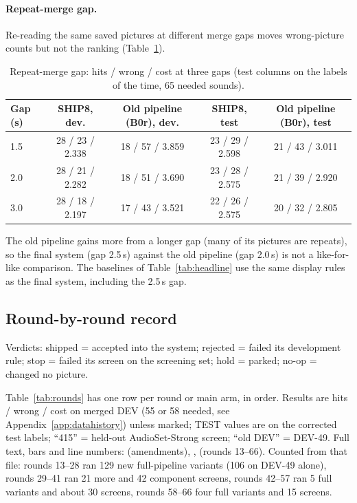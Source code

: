 \paragraph{Repeat-merge gap.} Re-reading the same saved pictures at different merge gaps moves wrong-picture counts but
not the ranking (Table~\ref{tab:mergegap}).
\begin{table}[htbp]\centering\small
\caption{Repeat-merge gap: hits / wrong / cost at three gaps (test columns on the labels of the time, 65 needed sounds).}\label{tab:mergegap}
\begin{tabular}{lcccc}
\toprule
Gap (s) & SHIP8, dev. & Old pipeline (B0r), dev. & SHIP8, test & Old pipeline (B0r), test \\
\midrule
1.5 & 28 / 23 / 2.338 & 18 / 57 / 3.859 & 23 / 29 / 2.598 & 21 / 43 / 3.011 \\
2.0 & 28 / 21 / 2.282 & 18 / 51 / 3.690 & 23 / 28 / 2.575 & 21 / 39 / 2.920 \\
3.0 & 28 / 18 / 2.197 & 17 / 43 / 3.521 & 22 / 26 / 2.575 & 20 / 32 / 2.805 \\
\bottomrule
\end{tabular}
\end{table}
The old pipeline gains more from a longer gap (many of its pictures are repeats), so the final system (gap 2.5\,s) against the
old pipeline (gap 2.0\,s) is not a like-for-like comparison. The baselines of Table~\ref{tab:headline} use the same
display rules as the final system, including the 2.5\,s gap.

\FloatBarrier
\subsection{Round-by-round record}\label{app:rounds}
Verdicts: shipped = accepted into the system; rejected = failed its development rule; stop = failed its screen on the
screening set; hold = parked; no-op = changed no picture.

Table~\ref{tab:rounds} has one row per round or main arm, in order. Results are hits / wrong / cost on merged DEV (55 or 58 needed, see
Appendix~\ref{app:datahistory}) unless marked; TEST values are on the corrected test labels; ``415'' = held-out AudioSet-Strong screen; ``old DEV'' = DEV-49. Full text,
bars and line numbers:  (amendments), ,
 (rounds 13--66). Counted from that file: rounds 13--28 ran 129 new
full-pipeline variants (106 on DEV-49 alone), rounds 29--41 ran 21 more and 42 component screens, rounds 42--57 ran 5
full variants and about 30 screens, rounds 58--66 four full variants and 15 screens.

